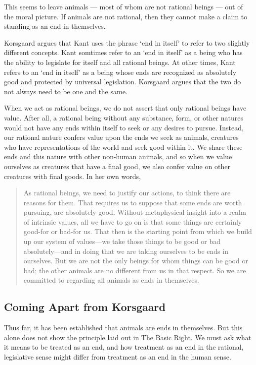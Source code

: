 	This seems to leave animals --- most of whom are not rational beings ---
	out of the moral picture.  If animals are not rational, then they cannot
	make a claim to standing as an end in themselves.

	Korsgaard argues that Kant uses the phrase ‘end in itself’ to refer to two
	slightly different concepts.  Kant somtimes refer to an ‘end in itself’ as
	a being who has the ability to legislate for itself and all rational
	beings.  At other times, Kant refers to an ‘end in itself’ as a being whose
	ends are recognized as absolutely good and protected by universal
	legislation.  Korsgaard argues that the two do not always need to be one
	and the same.

	When we act as rational beings, we do not assert that only rational beings
	have value.  After all, a rational being without any substance, form, or
	other natures would not have any ends within itself to seek or any desires
	to pursue.  Instead, our rational nature confers value upon the ends we
	seek as animals, creatures who have representations of the world and seek
	good within it.  We share these ends and this nature with other non-human
	animals, and so when we value ourselves as creatures that have a final
	good, we also confer value on other creatures with final goods.  In her own
	words,

	\begin{quote} As rational beings, we need to justify our actions, to think
		there are reasons for them. That requires us to suppose that some ends
		are worth pursuing, are absolutely good. Without metaphysical insight
		into a realm of intrinsic values, all we have to go on is that some
		things are certainly good-for or bad-for us. That then is the starting
		point from which we build up our system of values—we take those things
		to be good or bad absolutely—and in doing that we are taking ourselves
		to be ends in ourselves.  But we are not the only beings for whom
		things can be good or bad; the other animals are no different from us
		in that respect. So we are committed to regarding all animals as ends
		in themselves.\autocite[8.5.5]{kors} \end{quote}

		\subsection{Coming Apart from Korsgaard}

		Thus far, it has been established that animals are ends in themselves.
		But this alone does not show the principle laid out in The Basic Right.
		We must ask what it means to be treated as an end, and how treatment as
		an end in the rational, legislative sense might differ from treatment
		as an end in the human sense.

